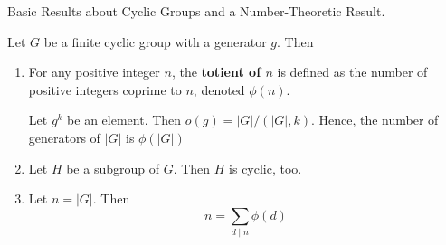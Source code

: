 \documentclass[../book.tex]{subfiles}
\begin{document}
\begin{lem} Basic Results about Cyclic Groups and a Number-Theoretic Result.
    
    Let $G$ be a finite cyclic group with a generator $g$. 
    Then \begin{enumerate}
        \item For any positive integer $n$, the \textbf{totient of $n$}
        is defined as the number of positive integers coprime to $n$, 
        denoted $\phi(n)$. 
        
        Let $g^k$ be an element. Then $o(g) = |G| / (|G|,k)$.
        Hence, the number of generators of $|G|$ is $\phi(|G|)$
        
        \item Let $H$ be a subgroup of $G$. Then $H$ is cyclic, too. 
        \item Let $n = |G|$. Then \[
            n = \sum_{d \mid n} \phi(d)
        \]
    \end{enumerate}
\end{lem}
\end{document}
